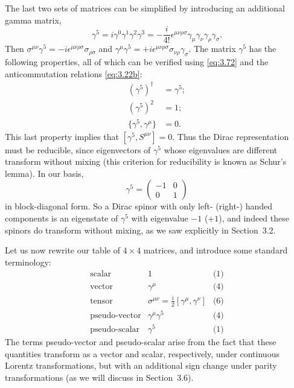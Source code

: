 The last two sets of matrices can be simplified by introducing an additional
gamma matrix,
\begin{equation}
  \gamma^5 = i\gamma^0\gamma^1\gamma^2\gamma^3
    = -\frac{i}{4!}\epsilon^{\mu\nu\rho\sigma}
      \gamma_\mu\gamma_\nu\gamma_\rho\gamma_\sigma .
  \label{eq:3.72}
\end{equation}
Then $\sigma^{\mu\nu}\gamma^5 = -i\epsilon^{\mu\nu\rho\sigma}\sigma_{\rho\sigma}$
and $\gamma^\mu\gamma^5 = +i\epsilon^{\mu\nu\rho\sigma}\sigma_{\nu\rho}\gamma_\sigma$.
The matrix $\gamma^5$ has the following properties, all of which can be
verified using \eqref{eq:3.72} and the anticommutation relations
\eqref{eq:3.22b}:
\begin{align}
  (\gamma^5)^\dagger &= \gamma^5; \label{eq:3.73}\\
  (\gamma^5)^2 &= 1; \label{eq:3.74}\\
  \{\gamma^5, \gamma^\mu\} &= 0 . \label{eq:3.75}
\end{align}
This last property implies that $[\gamma^5, S^{\mu\nu}] = 0$.  Thus the Dirac
representation must be reducible, since eigenvectors of $\gamma^5$ whose
eigenvalues are different transform without mixing (this criterion for
reducibility is known as Schur's lemma).  In our basis,
\begin{equation}
  \gamma^5 = \begin{pmatrix}-1&0\\0&1\end{pmatrix}
  \label{eq:3.76}
\end{equation}
in block-diagonal form.  So a Dirac spinor with only left- (right-) handed
components is an eigenstate of $\gamma^5$ with eigenvalue $-1$ ($+1$), and
indeed these spinors do transform without mixing, as we saw explicitly in
Section~3.2.

Let us now rewrite our table of $4\times4$ matrices, and introduce some
standard terminology:
\begin{equation}
  \begin{array}{lll}
    \text{scalar} & 1 & \text{(1)}\\
    \text{vector} & \gamma^\mu & \text{(4)}\\
    \text{tensor} & \sigma^{\mu\nu} = \tfrac{i}{2}[\gamma^\mu,\gamma^\nu]
      & \text{(6)}\\
    \text{pseudo-vector} & \gamma^\mu\gamma^5 & \text{(4)}\\
    \text{pseudo-scalar} & \gamma^5 & \text{(1)}
  \end{array}
  \label{eq:3.77}
\end{equation}
The terms pseudo-vector and pseudo-scalar arise from the fact that these
quantities transform as a vector and scalar, respectively, under continuous
Lorentz transformations, but with an additional sign change under parity
transformations (as we will discuss in Section~3.6).

